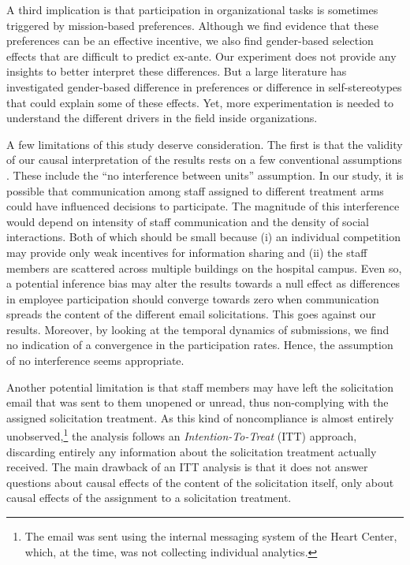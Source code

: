 \documentclass[11pt, titlepage]{article}
\begin{document}
A third implication is that participation in organizational tasks is
sometimes triggered by mission-based preferences. Although we find
evidence that these preferences can be an effective incentive, we also
find gender-based selection effects that are difficult to predict
ex-ante. Our experiment does not provide any insights to better
interpret these differences. But a large literature has investigated
gender-based difference in preferences \citep[see][ for a
review]{croson2009gender} or difference in self-stereotypes
\citep{coffman2014evidence} that could explain some of these effects.
Yet, more experimentation is needed to understand the different drivers
in the field inside organizations.

A few limitations of this study deserve consideration. The first is that
the validity of our causal interpretation of the results rests on a few
conventional assumptions \citep{rubin1974estimating}. These include the
``no interference between units'' assumption. In our study, it is
possible that communication among staff assigned to different treatment
arms could have influenced decisions to participate. The magnitude of
this interference would depend on intensity of staff communication and
the density of social interactions. Both of which should be small
because (i) an individual competition may provide only weak incentives
for information sharing and (ii) the staff members are scattered across
multiple buildings on the hospital campus. Even so, a potential
inference bias may alter the results towards a null effect as
differences in employee participation should converge towards zero when
communication spreads the content of the different email solicitations.
This goes against our results. Moreover, by looking at the temporal
dynamics of submissions, we find no indication of a convergence in the
participation rates. Hence, the assumption of no interference seems
appropriate.

Another potential limitation is that staff members may have left the
solicitation email that was sent to them unopened or unread, thus
non-complying with the assigned solicitation treatment. As this kind of
noncompliance is almost entirely unobserved,\footnote{The email was sent
  using the internal messaging system of the Heart Center, which, at the
  time, was not collecting individual analytics.} the analysis follows
an \emph{Intention-To-Treat} (ITT) approach, discarding entirely any
information about the solicitation treatment actually received. The main
drawback of an ITT analysis is that it does not answer questions about
causal effects of the content of the solicitation itself, only about
causal effects of the assignment to a solicitation treatment.
\end{document}
